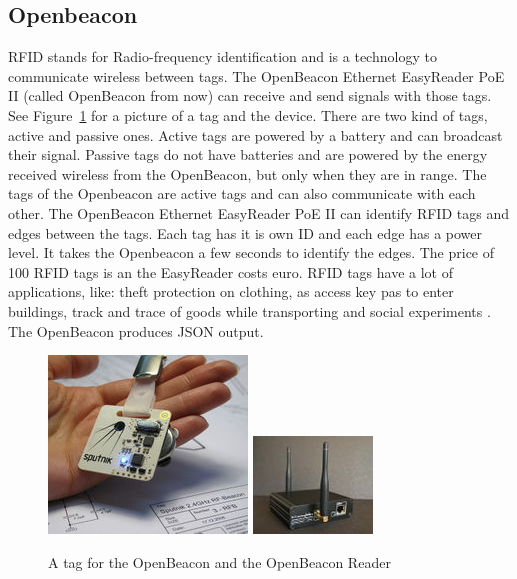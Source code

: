 	\subsection{Openbeacon}
	RFID stands for Radio-frequency identification and is a technology to communicate wireless between tags. The OpenBeacon Ethernet EasyReader PoE II (called OpenBeacon from now) can receive and send signals with those tags. See Figure~\ref{fig:openbeacon} for a picture of a tag and the device. There are two kind of tags, active and passive ones. Active tags are powered by a battery and can broadcast their signal. Passive tags do not have batteries and are powered by the energy received wireless from the OpenBeacon, but only when they are in range. The tags of the Openbeacon are active tags and can also communicate with each other. The OpenBeacon Ethernet EasyReader PoE II can identify RFID tags and edges between the tags. Each tag has it is own ID and each edge has a power level. It takes the Openbeacon a few seconds to identify the edges. The price of 100 RFID tags is  an the EasyReader costs  euro. RFID tags have a lot of applications, like: theft protection on clothing, as access key pas to enter buildings, track and trace of goods while transporting and social experiments \cite{2008arXiv0811.4170B}. The OpenBeacon produces JSON output.


			\begin{figure}[h]
				\label{fig:openbeacon}
				\centering
					\includegraphics[scale=0.5]{tag.jpg}
					\includegraphics[scale=1.0]{reader.jpg}
					
					\caption{A tag for the OpenBeacon \cite{openbeacon} and the OpenBeacon Reader}

			\end{figure}


